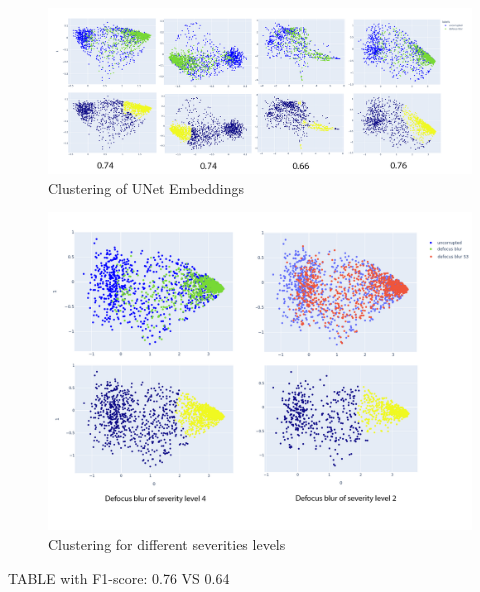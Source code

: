 \begin{figure}[htb]
	\begin{center}
		\includegraphics[width=\linewidth]{bilder/unet-embeddings/PacMAP.png}
		\caption{Clustering of UNet Embeddings}\label{fig:unet-clustering}
	\end{center}
\end{figure}

\begin{figure}[htb]
	\begin{center}
		\includegraphics[width=0.6\linewidth]{bilder/unet-embeddings/db-levels.png}
		\caption{Clustering for different severities levels}\label{fig:unet-clustering-sev-levels}
	\end{center}
\end{figure}

TABLE with F1-score:
0.76 VS 0.64